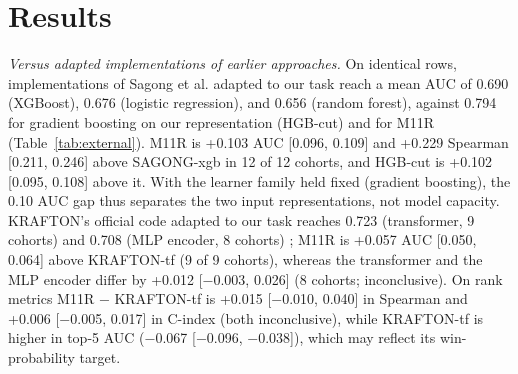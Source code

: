 \section{Results}\label{sec:results}

\emph{Versus adapted implementations of earlier approaches.} On identical rows, implementations of Sagong et al. adapted to our task reach a mean AUC of 0.690 (XGBoost), 0.676 (logistic regression), and 0.656 (random forest), against 0.794 for gradient boosting on our representation (HGB-cut) and for M11R (Table~\ref{tab:external}). M11R is +0.103 AUC [0.096, 0.109] and +0.229 Spearman [0.211, 0.246] above SAGONG-xgb in 12 of 12 cohorts, and HGB-cut is +0.102 [0.095, 0.108] above it. With the learner family held fixed (gradient boosting), the 0.10 AUC gap thus separates the two input representations, not model capacity. KRAFTON's official code adapted to our task reaches 0.723 (transformer, 9 cohorts) and 0.708 (MLP encoder, 8 cohorts) ; M11R is +0.057 AUC [0.050, 0.064] above KRAFTON-tf (9 of 9 cohorts), whereas the transformer and the MLP encoder differ by +0.012 [$-$0.003, 0.026] (8 cohorts; inconclusive). On rank metrics M11R $-$ KRAFTON-tf is +0.015 [$-$0.010, 0.040] in Spearman and +0.006 [$-$0.005, 0.017] in C-index (both inconclusive), while KRAFTON-tf is higher in top-5 AUC ($-$0.067 [$-$0.096, $-$0.038]), which may reflect its win-probability target. 

\begin{table}[t]
\caption{Adapted implementations of earlier approaches against our models: mean metrics over the cohorts each model covers (exploratory, seed 42, identical rows) and the pooled AUC difference of M11R over the model (12 cohorts; 9 for KRAFTON-tf). }
\label{tab:external}
\centering\scriptsize
\setlength{\tabcolsep}{3pt}
\resizebox{\columnwidth}{!}{}
\end{table}

